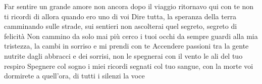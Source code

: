 \beginverse
Far sentire un grande amore non ancora
dopo il viaggio ritornavo qui con te
non ti ricordi di allora
quando ero uno di voi
Dire tutta, la speranza della terra
camminando sulle strade, sui sentieri
non ascolterai quel segreto,
segreto di felicità
\endverse
\beginchorus
Non cammino da solo mai più
cerco i tuoi occhi da sempre
guardi alla mia tristezza,
la cambi in sorriso e mi prendi con te
\endchorus
\beginverse
Accendere passioni tra la gente
nutrite dagli abbracci e dei sorrisi,
non le spegnerai con il vento
le ali del tuo respiro
Spegnere col sogno i miei ricordi
segnati col tuo sangue, con la morte
voi dormirete a quell'ora,
di tutti i silenzi la voce
\endverse
\endsong
